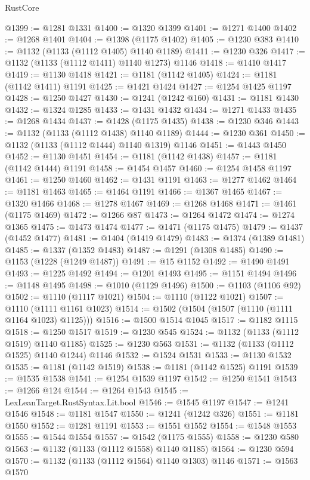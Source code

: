 \begin{lexlean}{RustCore}
\begin{coremodule}
@1399 := @1281 @1331
@1400 := @1320 @1399
@1401 := @1271 @1400
@1402 := @1268 @1401
@1404 := @1398 (@1175 @1402)
@1405 := @1230 @383
@1410 := @1132 (@1133 (@1112 @1405) @1140 @1189)
@1411 := @1230 @326
@1417 := @1132 (@1133 (@1112 @1411) @1140 @1273) @1146
@1418 := @1410 @1417
@1419 := @1130 @1418
@1421 := @1181 (@1142 @1405)
@1424 := @1181 (@1142 @1411) @1191
@1425 := @1421 @1424
@1427 := @1254 @1425 @1197
@1428 := @1250 @1427
@1430 := @1241 (@1242 @160)
@1431 := @1181 @1430
@1432 := @1324 @1285
@1433 := @1431 @1432
@1434 := @1271 @1433
@1435 := @1268 @1434
@1437 := @1428 (@1175 @1435)
@1438 := @1230 @346
@1443 := @1132 (@1133 (@1112 @1438) @1140 @1189)
@1444 := @1230 @361
@1450 := @1132 (@1133 (@1112 @1444) @1140 @1319) @1146
@1451 := @1443 @1450
@1452 := @1130 @1451
@1454 := @1181 (@1142 @1438)
@1457 := @1181 (@1142 @1444) @1191
@1458 := @1454 @1457
@1460 := @1254 @1458 @1197
@1461 := @1250 @1460
@1462 := @1431 @1191
@1463 := @1277 @1462
@1464 := @1181 @1463
@1465 := @1464 @1191
@1466 := @1367 @1465
@1467 := @1320 @1466
@1468 := @1278 @1467
@1469 := @1268 @1468
@1471 := @1461 (@1175 @1469)
@1472 := @1266 @87
@1473 := @1264 @1472
@1474 := @1274 @1365
@1475 := @1473 @1474
@1477 := @1471 (@1175 @1475)
@1479 := @1437 (@1452 @1477)
@1481 := @1404 (@1419 @1479)
@1483 := @1374 (@1389 @1481)
@1485 := @1337 (@1352 @1483)
@1487 := @1291 (@1308 @1485)
@1490 := @1153 (@1228 (@1249 @1487))
@1491 := @15 @1152
@1492 := @1490 @1491
@1493 := @1225 @1492
@1494 := @1201 @1493
@1495 := @1151 @1494
@1496 := @1148 @1495
@1498 := @1010 (@1129 @1496)
@1500 := @1103 (@1106 @92)
@1502 := @1110 (@1117 @1021)
@1504 := @1110 (@1122 @1021)
@1507 := @1110 (@1111 @1161 @1023)
@1514 := @1502 (@1504 (@1507 (@1110 (@1111 @1164 @1023) @1125)))
@1516 := @1500 @1514 @1045
@1517 := @1182 @1115
@1518 := @1250 @1517
@1519 := @1230 @545
@1524 := @1132 (@1133 (@1112 @1519) @1140 @1185)
@1525 := @1230 @563
@1531 := @1132 (@1133 (@1112 @1525) @1140 @1244) @1146
@1532 := @1524 @1531
@1533 := @1130 @1532
@1535 := @1181 (@1142 @1519)
@1538 := @1181 (@1142 @1525) @1191
@1539 := @1535 @1538
@1541 := @1254 @1539 @1197
@1542 := @1250 @1541
@1543 := @1266 @124
@1544 := @1264 @1543
@1545 := LexLeanTarget.RustSyntax.Lit.bool
@1546 := @1545 @1197
@1547 := @1241 @1546
@1548 := @1181 @1547
@1550 := @1241 (@1242 @326)
@1551 := @1181 @1550
@1552 := @1281 @1191
@1553 := @1551 @1552
@1554 := @1548 @1553
@1555 := @1544 @1554
@1557 := @1542 (@1175 @1555)
@1558 := @1230 @580
@1563 := @1132 (@1133 (@1112 @1558) @1140 @1185)
@1564 := @1230 @594
@1570 := @1132 (@1133 (@1112 @1564) @1140 @1303) @1146
@1571 := @1563 @1570

\end{coremodule}
\end{lexlean}
